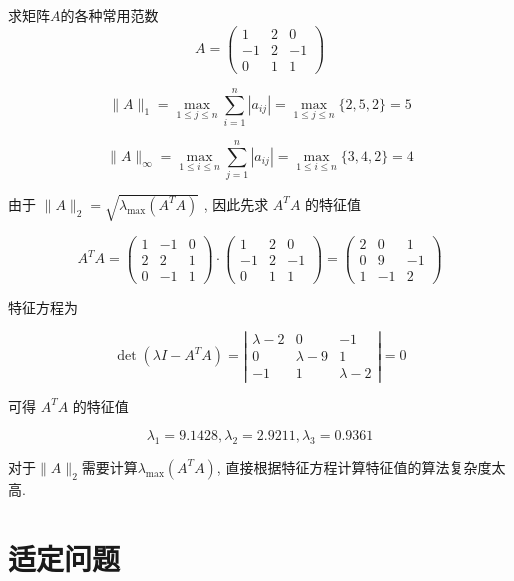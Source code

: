 \begin{example}
    求矩阵$A$的各种常用范数
$$
A=\left(\begin{array}{ccc}
1 & 2 & 0 \\
-1 & 2 & -1 \\
0 & 1 & 1
\end{array}\right)
$$

$$ \|A\|_{1}=\max _{1 \leq j \leq n} \sum_{i=1}^{n}\left|a_{i j}\right|=\max _{1 \leq j \leq n}\{2,5,2\}=5 $$

$$ \|A\|_{\infty}=\max _{1 \leq i \leq n} \sum_{j=1}^{n}\left|a_{i j}\right|=\max _{1 \leq i \leq n}\{3,4,2\}=4 $$

由于 $ \|A\|_{2}=\sqrt{\lambda_{\max }\left(A^{T} A\right)} $
, 因此先求 $ A^{T} A $ 的特征值

$$ A^{T} A=\left(\begin{array}{ccc}1 & -1 & 0 \\ 2 & 2 & 1 \\ 0 & -1 & 1\end{array}\right) \cdot\left(\begin{array}{ccc}1 & 2 & 0 \\ -1 & 2 & -1 \\ 0 & 1 & 1\end{array}\right)=\left(\begin{array}{ccc}2 & 0 & 1 \\ 0 & 9 & -1 \\ 1 & -1 & 2\end{array}\right) $$

特征方程为

$$ \operatorname{det}\left(\lambda I-A^{T} A\right)=\left|\begin{array}{ccc}\lambda-2 & 0 & -1 \\ 0 & \lambda-9 & 1 \\ -1 & 1 & \lambda-2\end{array}\right|=0 $$

可得 $ A^{T} A $ 的特征值

$$ \lambda_{1}=9.1428, \lambda_{2}=2.9211, \lambda_{3}=0.9361 $$

\end{example}

\begin{remark}
    对于$\|A\|_{2}$需要计算$\lambda_{\max }\left(A^{T} A\right)$, 直接根据特征方程计算特征值的算法复杂度太高.
\end{remark}

\chapter{适定问题}

